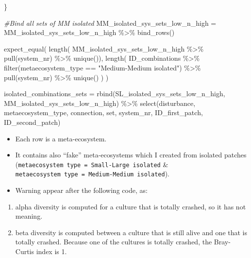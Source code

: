 \documentclass[
]{article}
\newenvironment{Shaded}{\begin{snugshade}}{\end{snugshade}}
\newcommand{\CommentTok}[1]{\textcolor[rgb]{0.56,0.35,0.01}{\textit{#1}}}
\newcommand{\FunctionTok}[1]{\textcolor[rgb]{0.00,0.00,0.00}{#1}}
\newcommand{\NormalTok}[1]{#1}
\newcommand{\OtherTok}[1]{\textcolor[rgb]{0.56,0.35,0.01}{#1}}
\newcommand{\SpecialCharTok}[1]{\textcolor[rgb]{0.00,0.00,0.00}{#1}}
\newcommand{\StringTok}[1]{\textcolor[rgb]{0.31,0.60,0.02}{#1}}
\providecommand{\tightlist}{%
  \setlength{\itemsep}{0pt}\setlength{\parskip}{0pt}}
\begin{document}
\begin{Shaded}
\begin{Highlighting}[]
\NormalTok{\}}

\CommentTok{\#Bind all sets of MM isolated}
\NormalTok{MM\_isolated\_sys\_sets\_low\_n\_high }\OtherTok{=}\NormalTok{ MM\_isolated\_sys\_sets\_low\_n\_high }\SpecialCharTok{\%\textgreater{}\%}
  \FunctionTok{bind\_rows}\NormalTok{()}
 
\FunctionTok{expect\_equal}\NormalTok{(}
  \FunctionTok{length}\NormalTok{(}
\NormalTok{    MM\_isolated\_sys\_sets\_low\_n\_high }\SpecialCharTok{\%\textgreater{}\%}
      \FunctionTok{pull}\NormalTok{(system\_nr) }\SpecialCharTok{\%\textgreater{}\%}
      \FunctionTok{unique}\NormalTok{()),}
  \FunctionTok{length}\NormalTok{(}
\NormalTok{    ID\_combinations }\SpecialCharTok{\%\textgreater{}\%}
      \FunctionTok{filter}\NormalTok{(metaecosystem\_type }\SpecialCharTok{==} \StringTok{"Medium{-}Medium isolated"}\NormalTok{) }\SpecialCharTok{\%\textgreater{}\%}
      \FunctionTok{pull}\NormalTok{(system\_nr) }\SpecialCharTok{\%\textgreater{}\%}
      \FunctionTok{unique}\NormalTok{()}
\NormalTok{    )}
\NormalTok{  )}
\end{Highlighting}
\end{Shaded}

\begin{Shaded}
\begin{Highlighting}[]
\NormalTok{isolated\_combinations\_sets }\OtherTok{=} \FunctionTok{rbind}\NormalTok{(SL\_isolated\_sys\_sets\_low\_n\_high, }
\NormalTok{                                   MM\_isolated\_sys\_sets\_low\_n\_high) }\SpecialCharTok{\%\textgreater{}\%}
  \FunctionTok{select}\NormalTok{(disturbance,}
\NormalTok{         metaecosystem\_type,}
\NormalTok{         connection,}
\NormalTok{         set,}
\NormalTok{         system\_nr,}
\NormalTok{         ID\_first\_patch,}
\NormalTok{         ID\_second\_patch)}
\end{Highlighting}
\end{Shaded}

\begin{itemize}
\item
  Each row is a meta-ecosystem.
\item
  It contains also ``fake'' meta-ecosystems which I created from
  isolated patches
  (\texttt{metaecosystem\ type\ =\ Small-Large\ isolated} \&
  \texttt{metaecosystem\ type\ =\ Medium-Medium\ isolated}).
\item
  Warning appear after the following code, as:
\end{itemize}

\begin{enumerate}
\def\labelenumi{(\roman{enumi})}
\tightlist
\item
  alpha diversity is computed for a culture that is totally crashed, so
  it has not meaning.
\item
  beta diversity is computed between a culture that is still alive and
  one that is totally crashed. Because one of the cultures is totally
  crashed, the Bray-Curtis index is 1.
\end{enumerate}
\end{document}
